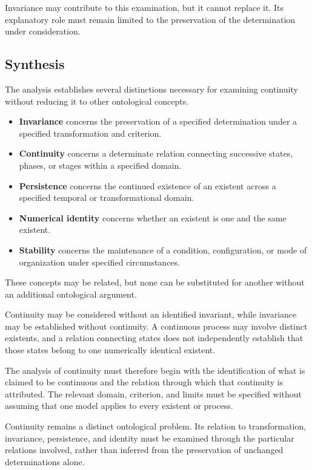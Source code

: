 Invariance may contribute to this examination,
but it cannot replace it. Its explanatory
role must remain limited to the preservation
of the determination under consideration.

\subsection{Synthesis}

The analysis establishes several distinctions
necessary for examining continuity without
reducing it to other ontological concepts.



\begin{itemize}
    \item \textbf{Invariance} concerns the preservation
          of a specified determination under a
          specified transformation and criterion.

    \item \textbf{Continuity} concerns a determinate
          relation connecting successive states,
          phases, or stages within a specified domain.

    \item \textbf{Persistence} concerns the continued
          existence of an existent across a
          specified temporal or transformational
          domain.

    \item \textbf{Numerical identity} concerns whether
          an existent is one and the same existent.

    \item \textbf{Stability} concerns the maintenance
          of a condition, configuration, or mode
          of organization under specified
          circumstances.
\end{itemize}

These concepts may be related, but none can
be substituted for another without an
additional ontological argument.

Continuity may be considered without an
identified invariant, while invariance may
be established without continuity. A
continuous process may involve distinct
existents, and a relation connecting states
does not independently establish that
those states belong to one numerically
identical existent.

The analysis of continuity must therefore
begin with the identification of what is
claimed to be continuous and the relation
through which that continuity is attributed.
The relevant domain, criterion, and limits
must be specified without assuming that
one model applies to every existent or process.

Continuity remains a distinct ontological
problem. Its relation to transformation,
invariance, persistence, and identity must
be examined through the particular relations
involved, rather than inferred from the
preservation of unchanged determinations
alone.

